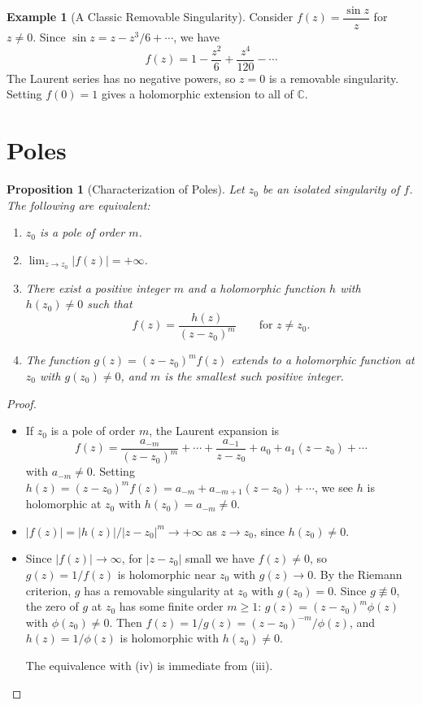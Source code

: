 \documentclass[12pt,a4paper,openany]{book}
\theoremstyle{definition}
\newtheorem{example}[definition]{Example}
\theoremstyle{plain}
\newtheorem{proposition}[definition]{Proposition}
\theoremstyle{remark}
\newcommand{\C}{\mathbb{C}}
\newcommand{\abs}[1]{\left|#1\right|}
\begin{document}
\begin{example}[A Classic Removable Singularity]\label{ex:removable-sinc}
Consider $f(z)=\dfrac{\sin z}{z}$ for $z\ne 0$. Since $\sin z = z - z^3/6 + \cdots$,
we have
\[
  f(z) = 1 - \frac{z^2}{6} + \frac{z^4}{120} - \cdots
\]
The Laurent series has no negative powers, so $z=0$ is a removable singularity.
Setting $f(0)=1$ gives a holomorphic extension to all of $\C$.
\end{example}

\section{Poles}
\label{sec:poles}

\begin{proposition}[Characterization of Poles]\label{prop:poles-characterization}
Let $z_0$ be an isolated singularity of $f$. The following are equivalent:
\begin{enumerate}[label=(\roman*)]
  \item $z_0$ is a pole of order $m$.
  \item $\lim_{z\to z_0}\abs{f(z)}=+\infty$.
  \item There exist a positive integer $m$ and a holomorphic function $h$ with
    $h(z_0)\ne 0$ such that
    \[
      f(z) = \frac{h(z)}{(z-z_0)^m} \qquad\text{for } z\ne z_0.
    \]
  \item The function $g(z)=(z-z_0)^m f(z)$ extends to a holomorphic function at
    $z_0$ with $g(z_0)\ne 0$, and $m$ is the smallest such positive integer.
\end{enumerate}
\end{proposition}

\begin{proof}\
\begin{itemize}[leftmargin=2em]
\item[\textbf{(i)$\Rightarrow$(iii)}:]
If $z_0$ is a pole of order $m$, the Laurent expansion is
\[
  f(z) = \frac{a_{-m}}{(z-z_0)^m} + \cdots + \frac{a_{-1}}{z-z_0}
  + a_0 + a_1(z-z_0) + \cdots
\]
with $a_{-m}\ne 0$. Setting $h(z)=(z-z_0)^m f(z)=a_{-m}+a_{-m+1}(z-z_0)+\cdots$,
we see $h$ is holomorphic at $z_0$ with $h(z_0)=a_{-m}\ne 0$.

\item[\textbf{(iii)$\Rightarrow$(ii)}:]
$\abs{f(z)} = \abs{h(z)}/\abs{z-z_0}^m \to +\infty$ as $z\to z_0$, since
$h(z_0)\ne 0$.

\item[\textbf{(ii)$\Rightarrow$(i)}:]
Since $\abs{f(z)}\to\infty$, for $\abs{z-z_0}$ small we have $f(z)\ne 0$, so
$g(z)=1/f(z)$ is holomorphic near $z_0$ with $g(z)\to 0$. By the Riemann criterion,
$g$ has a removable singularity at $z_0$ with $g(z_0)=0$. Since $g\not\equiv 0$,
the zero of $g$ at $z_0$ has some finite order $m\ge 1$: $g(z)=(z-z_0)^m\phi(z)$
with $\phi(z_0)\ne 0$. Then $f(z)=1/g(z)=(z-z_0)^{-m}/\phi(z)$, and $h(z)=1/\phi(z)$
is holomorphic with $h(z_0)\ne 0$.

The equivalence with (iv) is immediate from (iii).
\end{itemize}
\end{proof}
\end{document}
